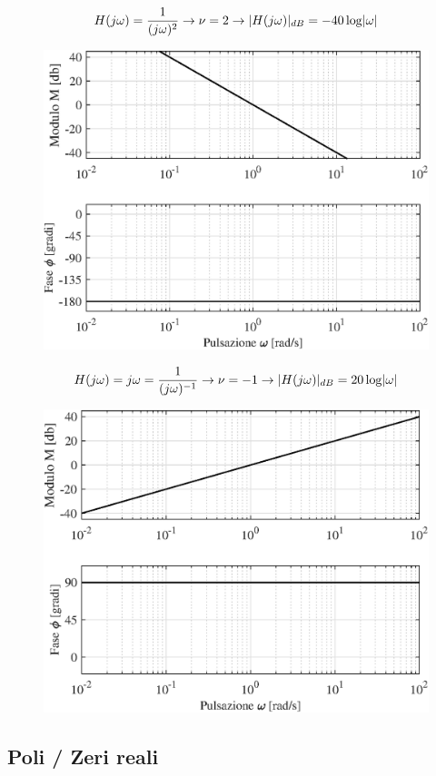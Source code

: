 \begin{nexample}
	\[ H(j\omega) = \frac{1}{(j\omega)^2} \rightarrow \nu = 2 \rightarrow \lvert H(j\omega)\rvert_{dB} = -40 \log \lvert\omega\rvert\]
\begin{figure}[H]
	\centering
	\includegraphics[width=0.7\linewidth]{immagini/cap6_Bode/es1}
	\label{fig:Bode_es1}
\end{figure}
\end{nexample}

\begin{nexample}
	\[ H(j\omega) =j\omega = \frac{1}{(j\omega)^{-1}} \rightarrow \nu = -1 \rightarrow \lvert H(j\omega)\rvert_{dB} = 20 \log \lvert\omega\rvert\]
\begin{figure}[H]
	\centering
	\includegraphics[width=0.7\linewidth]{immagini/cap6_Bode/es2}
	\label{fig:Bode_es2}
\end{figure}
\end{nexample}

\subsection{Poli / Zeri reali}

